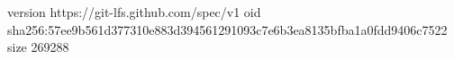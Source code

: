 version https://git-lfs.github.com/spec/v1
oid sha256:57ee9b561d377310e883d394561291093c7e6b3ea8135bfba1a0fdd9406c7522
size 269288

